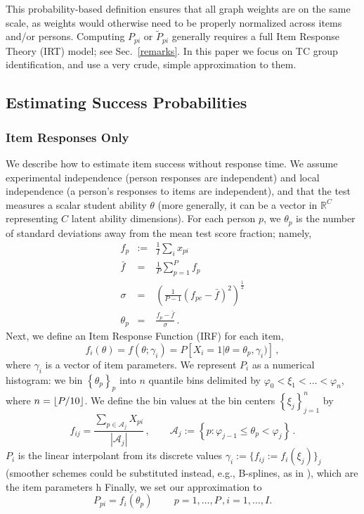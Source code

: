 \documentclass{article}
\DeclarePairedDelimiter\floor{\lfloor}{\rfloor}
\newcommand{\cA}{\mathcal{A}}
\newcommand{\ta}{\theta}
\newcommand{\R}{\mathbb{R}}
\begin{document}
This probability-based definition ensures that all graph weights are on the same scale, as weights would otherwise need to be properly normalized across items and/or persons. Computing $P_{pi}$ or $\tilde{P}_{pi}$ generally requires a full Item Response Theory (IRT) model; see Sec.~\ref{remarks}. In this paper we focus on TC group identification, and use a very crude, simple approximation to them.

\subsection{Estimating Success Probabilities}
\label{ability_estimation}

\subsubsection{Item Responses Only}
We describe how to estimate item success without response time. We assume experimental independence (person responses are independent) and local independence (a person's responses to items are independent), and that the test measures a scalar student ability $\theta$ (more generally, it can be a vector in $\R^C$ representing $C$ latent ability dimensions). For each person $p$, we $\theta_p$ is the number of standard deviations away from the mean test score fraction; namely,
\begin{eqnarray}
	f_{p} &:=& \frac{1}{I} \sum_i x_{pi} \\
	\bar{f} &=& \frac{1}{P} \sum_{p=1}^{P} f_{p} \\
	\sigma &=& \left(\frac{1}{P-1} (f_{pc} - \bar{f})^2 \right)^{\frac12} \\
	\theta_{p} &=& \frac{f_{p} - \bar{f}}{\sigma}\,.
	\label{theta_init}
\end{eqnarray}
Next, we define an Item Response Function (IRF) for each item,
\begin{equation}
  f_i(\theta) = f(\theta; \gamma_i) = P \left[X_i=1 | \theta=\theta_p, \gamma_i) \right]\,,
\end{equation}
where $\gamma_i$ is a vector of item parameters. We represent $P_i$ as a numerical histogram: we bin $\left\{\theta_p\right\}_p$ into $n$ quantile bins delimited by $\varphi_0 < \xi_1 < \dots < \varphi_n$, where $n = \floor*{P / 10}$. We define the bin values at the bin centers $\left\{\xi_j \right\}_{j=1}^n$ by
\begin{equation}
	\label{histogram_const}
	f_{ij} = \frac{\sum_{p \in \cA_j} X_{pi}}{|\cA_j|}\,,\qquad
	\cA_j := \left\{ p : \varphi_{j-1} \leq \ta_p < \varphi_j \right\}\,.
\end{equation}
$P_i$ is the linear interpolant from its discrete values $\gamma_i := \{f_{ij} := f_i(\xi_j)\}_j$ (smoother schemes could be substituted instead, e.g., B-splines, as in \cite{matt_bsplines}), which are the item parameters h Finally, we set our approximation to
\begin{equation}
	P_{pi} = f_i(\theta_p)\qquad\, p=1,\dots,P\,,i=1,\dots,I.
	\label{ppi_interpolation}
\end{equation}
\end{document}

